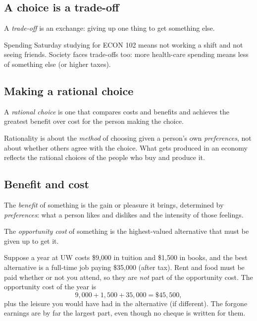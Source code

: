 \subsection{A choice is a trade-off}

\begin{definition}
A \emph{trade-off} is an exchange: giving up one thing to get something else.
\end{definition}

Spending Saturday studying for ECON 102 means not working a shift and not seeing
friends. Society faces trade-offs too: more health-care spending means less of
something else (or higher taxes).

\subsection{Making a rational choice}

\begin{definition}
A \emph{rational choice} is one that compares costs and benefits and achieves the
greatest benefit over cost for the person making the choice.
\end{definition}

Rationality is about the \emph{method} of choosing given a person's own
\emph{preferences}, not about whether others agree with the choice. What gets produced in
an economy reflects the rational choices of the people who buy and produce it.

\subsection{Benefit and cost}

\begin{definition}
The \emph{benefit} of something is the gain or pleasure it brings, determined by
\emph{preferences}: what a person likes and dislikes and the intensity of those feelings.
\end{definition}

\begin{definition}
The \emph{opportunity cost} of something is the highest-valued alternative that must be
given up to get it.
\end{definition}

\begin{example}
Suppose a year at UW costs \$9{,}000 in tuition and \$1{,}500 in books, and the best
alternative is a full-time job paying \$35{,}000 (after tax). Rent and food must be paid
whether or not you attend, so they are \emph{not} part of the opportunity cost. The
opportunity cost of the year is
\[
  9{,}000 + 1{,}500 + 35{,}000 = \$45{,}500,
\]
plus the leisure you would have had in the alternative (if different). The forgone
earnings are by far the largest part, even though no cheque is written for them.
\end{example}

